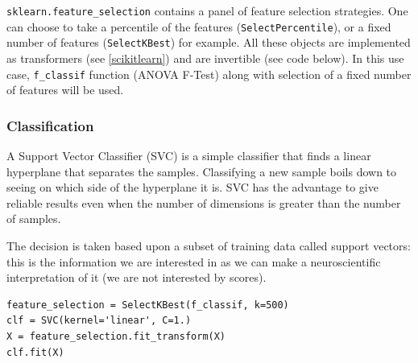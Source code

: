 \documentclass{frontiersSCNS} %
\begin{document}
\verb!sklearn.feature_selection! contains a panel of feature selection
strategies. One can choose to take a percentile of the features
(\verb!SelectPercentile!), or a fixed number of features (\verb!SelectKBest!)
for example. All these objects are implemented as transformers (see
\ref{scikitlearn}) and are invertible (see code below).
In this use case, \verb!f_classif! function (ANOVA F-Test) along with selection
of a fixed number of features will be used.

\subsubsection{Classification}

A Support Vector Classifier (SVC) is a simple classifier that finds a linear
hyperplane that separates the samples. Classifying a new sample boils down to
seeing on which side of the hyperplane it is. SVC has the advantage to
give reliable results even when the number of dimensions is greater than the
number of samples.

The decision is taken based upon a subset of training data called support
vectors: this is the information we are interested in as we can make a
neuroscientific interpretation of it (we are not interested by scores).

\begin{lstlisting}
feature_selection = SelectKBest(f_classif, k=500)
clf = SVC(kernel='linear', C=1.)
X = feature_selection.fit_transform(X)
clf.fit(X)
\end{lstlisting}



\end{document}

